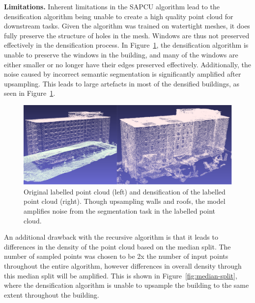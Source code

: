 \documentclass[10pt,twocolumn,letterpaper]{article}
\begin{document}
    \textbf{Limitations.}
    Inherent limitations in the SAPCU algorithm lead to the densification algorithm being unable to create a high quality point cloud for downstream tasks.
    Given the algorithm was trained on watertight meshes, it does fully preserve the structure of holes in the mesh. Windows are thus not preserved effectively in the densification process.
    In Figure~\ref{fig:densification-results}, the densification algorithm is unable to preserve the windows in the building, and many of the windows are either smaller or no longer have their edges preserved effectively.
    Additionally, the noise caused by incorrect semantic segmentation is significantly amplified after upsampling. This leads to large artefacts in most of the densified buildings, as seen in Figure~\ref{fig:densification-results}.

    \begin{figure}
        \centering
        \includegraphics[width=\linewidth]{densification_results.png}
        \caption{Original labelled point cloud (left) and densification of the labelled point cloud (right). Though upsampling walls and roofs, the model amplifies noise from the segmentation task in the labelled point cloud.}
        \label{fig:densification-results}
    \end{figure}

    An additional drawback with the recursive algorithm is that it leads to differences in the density of the point cloud based on the median split. 
    The number of sampled points was chosen to be 2x the number of input points throughout the entire algorithm, however differences in overall density through this median split will be amplified.
    This is shown in Figure~\ref{fig:median-split}, where the densification algorithm is unable to upsample the building to the same extent throughout the building.
\end{document}
